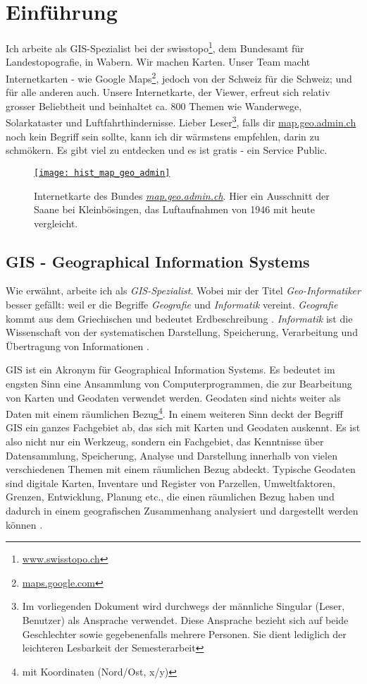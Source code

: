 \section{Einführung}
Ich arbeite als GIS-Spezialist bei der swisstopo\footnote{\href{https://www.swisstopo.ch}{www.swisstopo.ch}}, dem Bundesamt für Landestopografie, in Wabern. Wir machen Karten. Unser Team macht Internetkarten - wie Google Maps\footnote{\href{https://maps.google.com}{maps.google.com}}, jedoch von der Schweiz für die Schweiz; und für alle anderen auch. Unsere Internetkarte, der Viewer, erfreut sich relativ grosser Beliebtheit
und beinhaltet ca. 800 Themen wie Wanderwege, Solarkataster und Luftfahrthindernisse. Lieber Leser\footnote{Im vorliegenden Dokument wird durchwegs der männliche Singular (Leser, Benutzer) als Ansprache verwendet. Diese Ansprache bezieht sich auf beide Geschlechter sowie gegebenenfalls mehrere Personen. Sie dient lediglich der leichteren Lesbarkeit der Semesterarbeit}, falls dir \href{https://map.geo.admin.ch}{map.geo.admin.ch} noch kein Begriff sein sollte, kann ich dir wärmstens empfehlen, darin zu schmökern. Es gibt viel zu entdecken und es ist gratis - ein Service Public.

\begin{figure}[H]
	\centering
	\href{https://s.geo.admin.ch/8a82499889}{
	\texttt{[image: hist\_map\_geo\_admin]}}
	\caption{Internetkarte des Bundes \emph{\href{https://s.geo.admin.ch/8a82499889}{map.geo.admin.ch}}. Hier ein Ausschnitt der Saane bei Kleinbösingen, das Luftaufnahmen von 1946 mit heute vergleicht.}
	\label{fig:map.geo.admin.ch}
\end{figure}


\subsection{GIS - Geographical Information Systems}
Wie erwähnt, arbeite ich als \emph{GIS-Spezialist}. Wobei mir der Titel \emph{Geo-Informatiker} besser gefällt: weil er die Begriffe \emph{Geografie} und \emph{Informatik} vereint. \emph{Geografie} kommt aus dem Griechischen und bedeutet Erdbeschreibung \autocite[14]{Schertenleib2004}. \emph{Informatik} ist die Wissenschaft von der systematischen Darstellung, Speicherung, Verarbeitung und Übertragung von Informationen \cite{Informatik2010}.

GIS ist ein Akronym für Geographical Information Systems. Es bedeutet im engsten Sinn eine Ansammlung von Computerprogrammen, die zur Bearbeitung von Karten und Geodaten verwendet werden. Geodaten sind nichts weiter als Daten mit einem räumlichen Bezug\footnote{mit Koordinaten (Nord/Ost, x/y)}. In einem weiteren Sinn deckt der Begriff GIS ein ganzes Fachgebiet ab, das sich mit Karten und Geodaten auskennt. Es ist also nicht nur ein Werkzeug, sondern ein Fachgebiet, das Kenntnisse über Datensammlung, Speicherung, Analyse und Darstellung innerhalb von vielen verschiedenen Themen mit einem räumlichen Bezug abdeckt. Typische Geodaten sind digitale Karten, Inventare und Register von Parzellen, Umweltfaktoren, Grenzen, Entwicklung, Planung etc., die einen räumlichen Bezug haben und dadurch in einem geografischen Zusammenhang analysiert und dargestellt werden können \autocite[15]{Balstroem}.

